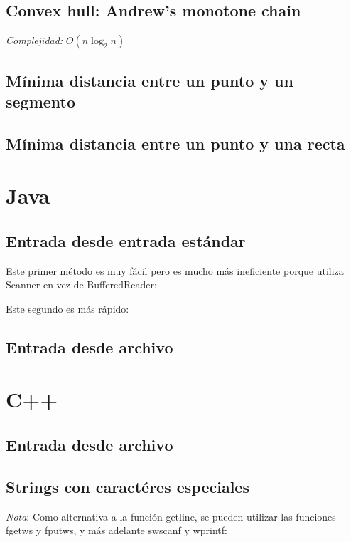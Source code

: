 \documentclass[10pt,letterpaper]{article}
\begin{document}
\subsection{Convex hull: Andrew's monotone chain}
\emph{Complejidad:} $ O(n \log_{2}{n}) $

\subsection{Mínima distancia entre un punto y un segmento}

\subsection{Mínima distancia entre un punto y una recta}

\section{Java}
\subsection{Entrada desde entrada estándar}
Este primer método es muy fácil pero es mucho más ineficiente porque utiliza Scanner en vez de BufferedReader: \\

\bigskip

Este segundo es más rápido: \\
\subsection{Entrada desde archivo}

\section{C++}
\subsection{Entrada desde archivo}

\subsection{Strings con caractéres especiales}

\emph{Nota}: Como alternativa a la función getline, se pueden utilizar las funciones fgetws y fputws, y más adelante swscanf y wprintf:
\end{document}
